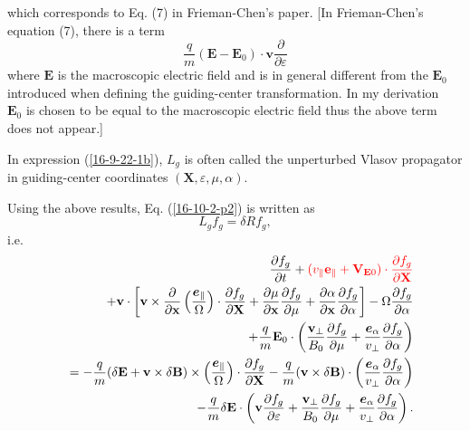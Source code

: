 \documentclass{llncs}
\newcommand{\tmcolor}[2]{{\color{#1}{#2}}}
\newcommand{\tmmathbf}[1]{\ensuremath{\boldsymbol{#1}}}
\begin{document}
which corresponds to Eq. (7) in Frieman-Chen's paper{\cite{frieman1982}}. [In
Frieman-Chen's equation (7), there is a term
\[ \frac{q}{m} (\mathbf{E}-\mathbf{E}_0) \cdot \mathbf{v}
   \frac{\partial}{\partial \varepsilon} \]
where $\mathbf{E}$ is the macroscopic electric field and is in general
different from the $\mathbf{E}_0$ introduced when defining the guiding-center
transformation. In my derivation \ $\mathbf{E}_0$ is chosen to be equal to the
macroscopic electric field thus the above term does not appear.]

In expression (\ref{16-9-22-1b}), $L_g$ is often called the unperturbed Vlasov
propagator in guiding-center coordinates $(\mathbf{X}, \varepsilon, \mu,
\alpha)$.

Using the above results, Eq. (\ref{16-10-2-p2}) is written as
\begin{equation}
  \label{16-9-22-p1} L_g f_g = \delta R f_g,
\end{equation}
i.e.
\begin{eqnarray}
  &  & \frac{\partial f_g}{\partial t} + \tmcolor{red}{(v_{\parallel}
  \mathbf{e}_{\parallel} +\mathbf{V}_{\mathbf{E}0}) \cdot \frac{\partial
  f_g}{\partial \mathbf{X}}} \nonumber\\
  &  & +\mathbf{v} \cdot \left[ \mathbf{v} \times \frac{\partial}{\partial
  \mathbf{x}} \left( \frac{\tmmathbf{e}_{\parallel}}{\Omega} \right) \cdot
  \frac{\partial f_g}{\partial \mathbf{X}} + \frac{\partial \mu}{\partial
  \mathbf{x}}  \frac{\partial f_g}{\partial \mu} + \frac{\partial
  \alpha}{\partial \mathbf{x}}  \frac{\partial f_g}{\partial \alpha} \right] -
  \Omega \frac{\partial f_g}{\partial \alpha} \nonumber\\
  &  & + \frac{q}{m} \mathbf{E}_0 \cdot \left( \frac{\mathbf{v}_{\perp}}{B_0}
  \frac{\partial f_g}{\partial \mu} + \frac{\tmmathbf{e}_{\alpha}}{v_{\perp}}
  \frac{\partial f_g}{\partial \alpha} \right) \nonumber\\
  &  & = - \frac{q}{m} (\delta \mathbf{E}+\mathbf{v} \times \delta
  \mathbf{B}) \times \left( \frac{\tmmathbf{e}_{\parallel}}{\Omega}  \right)
  \cdot \frac{\partial f_g}{\partial \mathbf{X}} - \frac{q}{m} (\mathbf{v}
  \times \delta \mathbf{B}) \cdot \left(
  \frac{\tmmathbf{e}_{\alpha}}{v_{\perp}}  \frac{\partial f_g}{\partial
  \alpha} \right) \nonumber\\
  &  & - \frac{q}{m} \delta \mathbf{E} \cdot \left( \mathbf{v} \frac{\partial
  f_g}{\partial \varepsilon} + \frac{\mathbf{v}_{\perp}}{B_0}  \frac{\partial
  f_g}{\partial \mu} + \frac{\tmmathbf{e}_{\alpha}}{v_{\perp}}  \frac{\partial
  f_g}{\partial \alpha} \right) .  \label{18-12-16-1}
\end{eqnarray}
\end{document}
